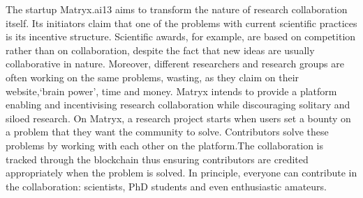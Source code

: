 \documentclass[runningheads]{llncs}
\begin{document}
The startup Matryx.ai13 aims to transform the nature of research collaboration itself. Its initiators claim that one of the problems with current scientific practices is its incentive structure. Scientific awards, for example, are based on competition rather than on collaboration, despite the fact that new ideas are usually collaborative in nature. Moreover, different researchers and research groups are often working on the same problems, wasting, as they claim on their website,‘brain power’, time and money. Matryx intends to provide a platform enabling and incentivising research collaboration while discouraging solitary and siloed research. On Matryx, a research project starts when users set a bounty on a problem that they want the community to solve. Contributors solve these problems by working with each other on the platform.The collaboration is tracked through the blockchain thus ensuring contributors are credited appropriately when the problem is solved. In principle, everyone can contribute in the collaboration: scientists, PhD students and even enthusiastic amateurs.
\end{document}
